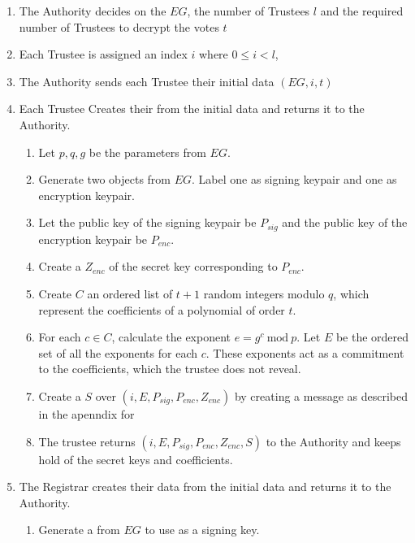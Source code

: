 \begin{enumerate}
    \item The Authority decides on the  $EG$, the number of Trustees $l$ and the required number of Trustees to decrypt the votes $t$
    \item Each Trustee is assigned an index $i$ where $0 \leq i < l$,
    \item The Authority sends each Trustee their initial data $(EG, i, t)$
    \item Each Trustee Creates their  from the initial data and returns it to the Authority.
          \begin{enumerate}
              \item Let $p,q,g$ be the parameters from $EG$.
              \item Generate two  objects from $EG$. Label one as signing keypair and one as encryption keypair.
              \item Let the public key of the signing keypair be $P_{sig}$ and the public key of the encryption keypair be $P_{enc}$.
              \item Create a  $Z_{enc}$ of the secret key corresponding to $P_{enc}$.
              \item Create $C$ an ordered list of $t + 1$ random integers modulo $q$, which represent the coefficients of a polynomial of order $t$.
              \item For each $c \in C$, calculate the exponent $e = g^c\ \textrm{mod}\ p$. Let $E$ be the ordered set of all the exponents for each $c$. These exponents act as a commitment to the coefficients, which the trustee does not reveal.
              \item Create a  $S$ over $(i, E, P_{sig}, P_{enc}, Z_{enc})$ by creating a message as described in the apenndix for 
              \item The trustee returns $(i, E, P_{sig}, P_{enc}, Z_{enc}, S)$ to the Authority and keeps hold of the secret keys and coefficients.
          \end{enumerate}
    \item The Registrar creates their  data from the initial data and returns it to the Authority.
          \begin{enumerate}
              \item Generate a  from $EG$ to use as a signing key.

\end{enumerate}
\end{enumerate}

